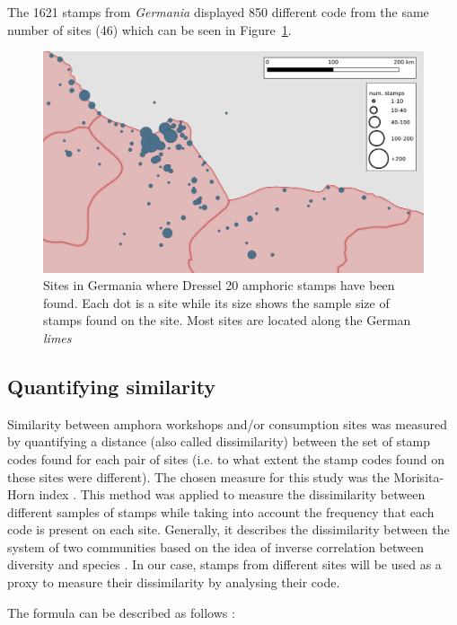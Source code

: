 The 1621 stamps from \textit{Germania} displayed 850 different code from the same number of sites (46) which can be seen in Figure~\ref{germania}.

\begin{figure}[htp]
	\centering
\includegraphics[width=\linewidth]{germania}
\caption{Sites in Germania where Dressel 20 amphoric stamps have been found. Each dot is a site while its size shows the sample size of stamps found on the site. Most sites are located along the German \textit{limes}}
\label{germania}
\end{figure}

\subsection{Quantifying similarity}
\label{sec:5}

Similarity between amphora workshops and/or consumption sites was measured by quantifying a distance (also called dissimilarity) between the set of stamp codes found for each pair of sites (i.e. to what extent the stamp codes found on these sites were different). The chosen measure for this study was the Morisita-Horn index \citep{morisita_measuring_1959, horn_measurement_1966}. This method was applied to measure the dissimilarity between different samples of stamps while taking into account the frequency that each code is present on each site. Generally, it describes the dissimilarity between the system of two communities based on the idea of inverse correlation between diversity and species \citep{magurran_why_1988}. In our case, stamps from different sites will be used as a proxy to measure their dissimilarity by analysing their code. 

The formula can be described as follows \citep{magurran_measuring_2013}:

